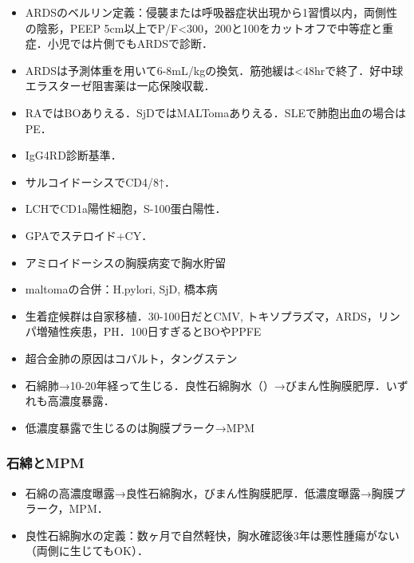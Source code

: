 \begin{itemize}
\item ARDSのベルリン定義：侵襲または呼吸器症状出現から1習慣以内，両側性の陰影，PEEP 5cm以上でP/F<300，200と100をカットオフで中等症と重症．小児では片側でもARDSで診断．
\item ARDSは予測体重を用いて6-8mL/kgの換気．筋弛緩は<48hrで終了．好中球エラスターゼ阻害薬は一応保険収載．


\item RAではBOありえる．SjDではMALTomaありえる．SLEで肺胞出血の場合はPE．
\item IgG4RD診断基準．
\item サルコイドーシスでCD4/8↑．
\item LCHでCD1a陽性細胞，S-100蛋白陽性．
\item GPAでステロイド+CY．
\item アミロイドーシスの胸膜病変で胸水貯留
\item maltomaの合併：H.pylori, SjD, 橋本病

\item 生着症候群は自家移植．30-100日だとCMV, トキソプラズマ，ARDS，リンパ増殖性疾患，PH．100日すぎるとBOやPPFE

\item 超合金肺の原因はコバルト，タングステン
\item 石綿肺→10-20年経って生じる．良性石綿胸水（）→びまん性胸膜肥厚．いずれも高濃度暴露．
\item 低濃度暴露で生じるのは胸膜プラーク→MPM

\end{itemize}

\subsubsection{石綿とMPM}
\begin{itemize}
\item 石綿の高濃度曝露→良性石綿胸水，びまん性胸膜肥厚．低濃度曝露→胸膜プラーク，MPM．
\item 良性石綿胸水の定義：数ヶ月で自然軽快，胸水確認後3年は悪性腫瘍がない（両側に生じてもOK）．

\end{itemize}


